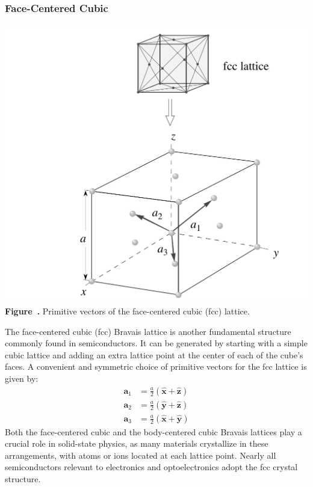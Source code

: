 \subsubsection{Face-Centered Cubic}

\begin{center}
	\begin{minipage}{0.5\textwidth}
		\centering
		\includegraphics[width=\textwidth]{img/fcc.png}
		\\[0.5em]
		\textbf{Figure~\thefigure.} Primitive vectors of the face-centered cubic (fcc) lattice.
		\label{fig:fcc_lattice}
	\end{minipage}
\end{center}

The face-centered cubic (fcc) Bravais lattice is another fundamental structure commonly found in semiconductors. It can be generated by starting with a simple cubic lattice and adding an extra lattice point at the center of each of the cube's faces.
A convenient and symmetric choice of primitive vectors for the fcc lattice is given by:
\begin{align*}
	\mathbf{a}_1 & = \frac{a}{2} (\hat{\mathbf{x}} + \hat{\mathbf{z}}) \\
	\mathbf{a}_2 & = \frac{a}{2} (\hat{\mathbf{y}} + \hat{\mathbf{z}}) \\
	\mathbf{a}_3 & = \frac{a}{2} (\hat{\mathbf{x}} + \hat{\mathbf{y}})
\end{align*}
Both the face-centered cubic and the body-centered cubic Bravais lattices play a crucial role in solid-state physics, as many materials crystallize in these arrangements, with atoms or ions located at each lattice point. Nearly all semiconductors relevant to electronics and optoelectronics adopt the fcc crystal structure.


